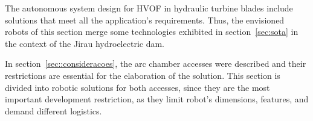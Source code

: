 The autonomous system design for HVOF in hydraulic turbine blades include
solutions that meet all the application's requirements. Thus, the envisioned
robots of this section merge some technologies exhibited in
section~\ref{sec:sota} in the context of the Jirau hydroelectric dam.


In section~\ref{sec::consideracoes}, the arc chamber accesses were described
and their restrictions are essential for the elaboration of the solution.
This section is divided into robotic solutions for both accesses, since they
are the most important development restriction, as they limit robot's
dimensions, features, and demand different logistics.

